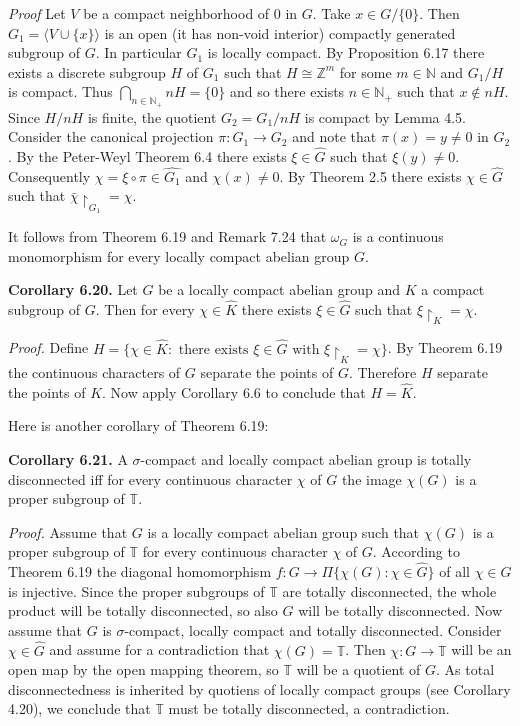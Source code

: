 \documentclass[12pt]{article}
\begin{document}
\begin{itemize}
\begin{itemize}
\emph{Proof} Let $V$ be a compact neighborhood of 0 in $G$. Take $x \in G / \{0\}$. Then $G_1 = \langle V \cup \{x\} \rangle$ is an open (it
has non-void interior) compactly generated subgroup of $G$. In particular $G_1$ is locally compact. By Proposition
6.17 there exists a discrete subgroup $H$ of $G_1$ such that $H \cong \mathbb{Z}^m$ for some $m \in \mathbb{N}$ and $G_1/H$ is compact. Thus
$\bigcap_{n \in \mathbb{N}_+} nH = \{0\}$ and so there exists $n \in \mathbb{N}_+$ such that $x \notin nH$. Since $H/nH$ is finite, the quotient $G_2 = G_1/nH$
is compact by Lemma 4.5. Consider the canonical projection $\pi : G_1 \to G_2$ and note that $\pi(x) = y \neq 0$ in $G_2$.
By the Peter-Weyl Theorem 6.4 there exists $\xi \in \hat{G}$ such that $\xi(y) \neq 0$. Consequently $\chi = \xi \circ \pi \in \hat{G_1}$ and
$\chi(x) \neq 0$. By Theorem 2.5 there exists $\chi \in \hat{G}$ such that $\bar{\chi} \upharpoonright_{G_1}= \chi$.


    It follows from Theorem 6.19 and Remark 7.24 that $\omega_G$ is a continuous monomorphism for every locally
compact abelian group $G$.


\textbf{Corollary 6.20.} Let $G$ be a locally compact abelian group and $K$ a compact subgroup of $G$. Then for every
$\chi \in \hat{K}$ there exists $\xi \in \hat{G}$ such that $\xi \upharpoonright_K = \chi$.


    \emph{Proof.} Define $H = \{ \chi \in \hat{K} : \text{ there exists } \xi \in \hat{G} \text{ with } \xi \upharpoonright_K= \chi \}$. By Theorem 6.19 the continuous characters of
$G$ separate the points of $G$. Therefore $H$ separate the points of $K$. Now apply Corollary 6.6 to conclude that
$H = \hat{K}$.


    Here is another corollary of Theorem 6.19:


\textbf{Corollary 6.21.} A $\sigma$-compact and locally compact abelian group is totally disconnected iff for every continuous
character $\chi$ of $G$ the image $\chi(G)$ is a proper subgroup of $\mathbb{T}$.


    \emph{Proof.} Assume that $G$ is a locally compact abelian group such that $\chi(G)$ is a proper subgroup of $\mathbb{T}$ for every
continuous character $\chi$ of $G$. According to Theorem 6.19 the diagonal homomorphism $f : G \to \Pi \{ \chi(G) : \chi \in \hat{G} \}$
of all $\chi \in \hat{G}$ is injective. Since the proper subgroups of $\mathbb{T}$ are totally disconnected, the whole product will be
totally disconnected, so also $G$ will be totally disconnected. Now assume that $G$ is $\sigma$-compact, locally compact
and totally disconnected. Consider $\chi \in \hat{G}$ and assume for a contradiction that $\chi(G) = \mathbb{T}$. Then $\chi : G \to \mathbb{T}$
will be an open map by the open mapping theorem, so $\mathbb{T}$ will be a quotient of $G$. As total disconnectedness
is inherited by quotiens of locally compact groups (see Corollary 4.20), we conclude that $\mathbb{T}$ must be totally
disconnected, a contradiction.



\end{itemize}
\end{itemize}
\end{document}
